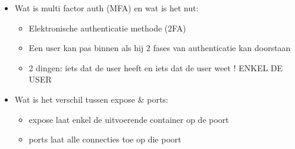 \documentclass{article}
\begin{document}
\begin{itemize}
\begin{itemize}
    \end{itemize}
    \item Wat is multi factor auth (MFA) en wat is het nut:
    \begin{itemize}
        \item Elektronische authenticatie methode (2FA)
        \item Een user kan pas binnen als hij 2 fases van authenticatie kan doorstaan
        \item 2 dingen: iets dat de user heeft en iets dat de user weet ! ENKEL DE USER
    \end{itemize}
    \item Wat is het verschil tussen expose \& ports:
    \begin{itemize}
        \item expose laat enkel de uitvoerende container op de poort
        \item ports laat alle connecties toe op die poort
    \end{itemize}
\end{itemize}
\end{document}
